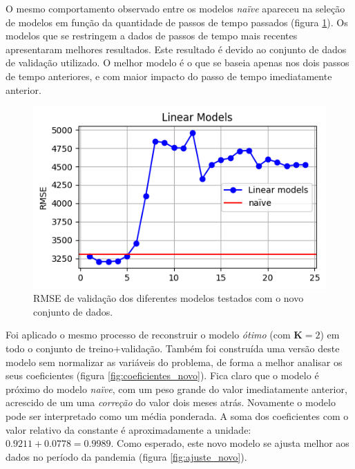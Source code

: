 \documentclass[final,5p]{elsarticle}
\numberwithin{equation}{section}
\begin{document}
        O mesmo comportamento observado entre os modelos \emph{naïve} apareceu na seleção de modelos em função da quantidade de passos de tempo passados (figura \ref{fig:modelos_lineares_novo}). Os modelos que se restringem a dados de passos de tempo mais recentes apresentaram melhores resultados. Este resultado é devido ao conjunto de dados de validação utilizado. O melhor modelo é o que se baseia apenas nos dois passos de tempo anteriores, e com maior impacto do passo de tempo imediatamente anterior.

        \begin{figure}[hbt!]
            \includegraphics[width=0.95\columnwidth]{C1_LinearModels.png}
            \caption{RMSE de validação dos diferentes modelos testados com o novo conjunto de dados.}
            \label{fig:modelos_lineares_novo}
        \end{figure}

        Foi aplicado o mesmo processo de reconstruir o modelo \emph{ótimo} (com $\textbf{K} = 2$) em todo o conjunto de treino+validação. Também foi construída uma versão deste modelo sem normalizar as variáveis do problema, de forma a melhor analisar os seus coeficientes (figura \ref{fig:coeficientes_novo}). Fica claro que o modelo é próximo do modelo \emph{naïve}, com um peso grande do valor imediatamente anterior, acrescido de um uma \emph{correção} do valor dois meses atrás. Novamente o modelo pode ser interpretado como um média ponderada. A soma dos coeficientes com o valor relativo da constante é aproximadamente a unidade: $ 0.9211 + 0.0778 = 0.9989$. Como esperado, este novo modelo se ajusta melhor aos dados no período da pandemia (figura \ref{fig:ajuste_novo}).
\end{document}
